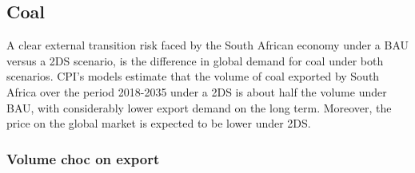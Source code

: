 \documentclass[12pt,english]{article}
\begin{document}
\subsection{Coal}

A clear external transition risk faced by the South African economy under a BAU versus a 2DS scenario, is the difference in global demand for coal under both scenarios. CPI's models estimate that the volume of coal exported by South Africa over the period 2018-2035 under a 2DS is about half the volume under BAU, with considerably lower export demand on the long term. Moreover, the price on the global market is expected to be lower under 2DS. 

\subsubsection{Volume choc on export}
\end{document}
